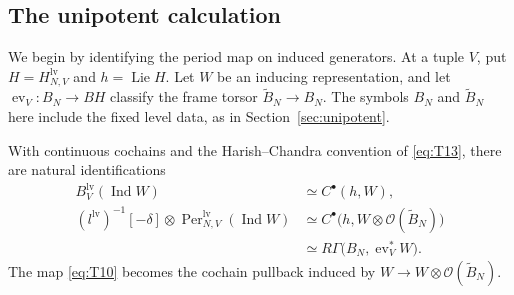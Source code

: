 \subsection{The unipotent calculation}

We begin by identifying the period map on induced generators.  At a tuple
$V$, put $H=H_{N,V}^{\mathrm{lv}}$ and $h=\operatorname{Lie}H$.  Let $W$ be
an inducing representation, and let
$\operatorname{ev}_V:B_N\to BH$ classify the frame torsor
$\widetilde B_N\to B_N$.  The symbols $B_N$ and $\widetilde B_N$ here
include the fixed level data, as in Section~\ref{sec:unipotent}.

\begin{lemma}\label{lem:ran-shapiro}
With continuous cochains and the Harish--Chandra convention of
\eqref{eq:T13}, there are natural identifications
\begin{equation}\label{eq:T19}
\begin{aligned}
 B_V^{\mathrm{lv}}(\operatorname{Ind}W)
   &\simeq C^\bullet(h,W),\\
 (l^{\mathrm{lv}})^{-1}[-\delta]\otimes
       \operatorname{Per}_{N,V}^{\mathrm{lv}}(\operatorname{Ind}W)
   &\simeq C^\bullet\bigl(h,W\otimes
                                  \mathcal O(\widetilde B_N)\bigr)\\
   &\simeq R\Gamma\bigl(B_N,\operatorname{ev}_V^*W\bigr).
\end{aligned}
\end{equation}
The map \eqref{eq:T10} becomes the cochain pullback induced by
$W\to W\otimes\mathcal O(\widetilde B_N)$.
\end{lemma}

